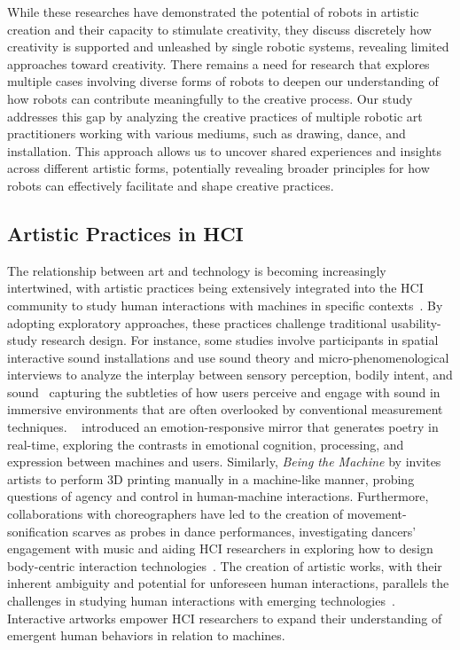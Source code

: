 While these researches have demonstrated the potential of robots in artistic creation and their capacity to stimulate creativity, they discuss discretely how creativity is supported and unleashed by single robotic systems, revealing limited approaches toward creativity. There remains a need for research that explores multiple cases involving diverse forms of robots to deepen our understanding of how robots can contribute meaningfully to the creative process. Our study addresses this gap by analyzing the creative practices of multiple robotic art practitioners working with various mediums, such as drawing, dance, and installation. This approach allows us to uncover shared experiences and insights across different artistic forms, potentially revealing broader principles for how robots can effectively facilitate and shape creative practices.

\subsection{Artistic Practices in HCI}

The relationship between art and technology is becoming increasingly intertwined, with artistic practices being extensively integrated into the HCI community to study human interactions with machines in specific contexts~\cite{jeon2019rituals}. By adopting exploratory approaches, these practices challenge traditional usability-study research design. For instance, some studies involve participants in spatial interactive sound installations and use sound theory and micro-phenomenological interviews to analyze the interplay between sensory perception, bodily intent, and sound~\cite{Robson2024sound, Frid2019sound} capturing the subtleties of how users perceive and engage with sound in immersive environments that are often overlooked by conventional measurement techniques. ~\citet{Rajcic2020mirror} introduced an emotion-responsive mirror that generates poetry in real-time, exploring the contrasts in emotional cognition, processing, and expression between machines and users. Similarly, \textit{Being the Machine} by \citet{devendorf2015being} invites artists to perform 3D printing manually in a machine-like manner, probing questions of agency and control in human-machine interactions. Furthermore, collaborations with choreographers have led to the creation of movement-sonification scarves as probes in dance performances, investigating dancers' engagement with music and aiding HCI researchers in exploring how to design body-centric interaction technologies~\cite{Bang2023dance}. The creation of artistic works, with their inherent ambiguity and potential for unforeseen human interactions, parallels the challenges in studying human interactions with emerging technologies~\cite{coessens2009artistic}. Interactive artworks empower HCI researchers to expand their understanding of emergent human behaviors in relation to machines.

